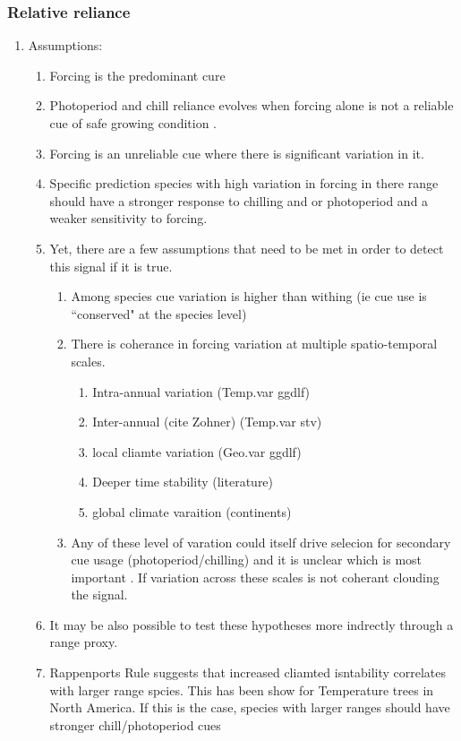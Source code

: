 \documentclass[11pt]{article}\usepackage[]{graphicx}\usepackage[]{color}
\begin{document}
\subsubsection{Relative reliance}
\begin{enumerate}
\item Assumptions:
\begin{enumerate}
\item Forcing is the predominant cure
\item Photoperiod and chill reliance evolves when forcing alone is not a reliable cue of safe growing condition \citep{Korner:2010aa}.
\item Forcing is an unreliable cue where there is significant variation in it.
\item Specific prediction species with high variation in forcing in there range should have a stronger response to chilling and or photoperiod and a weaker sensitivity to forcing. 
\item Yet, there are a few assumptions that need to be met in order to detect this signal if it is true.\\
\begin{enumerate}
\item Among species cue variation is higher than withing (ie cue use is ``conserved" at the species level)
\item There is coherance in forcing variation at multiple spatio-temporal scales.
\begin{enumerate}
\item Intra-annual variation (Temp.var ggdlf)
\item Inter-annual (cite Zohner) (Temp.var stv)
\item local cliamte variation (Geo.var ggdlf)
\item Deeper time stability \citep{} (literature)
\item global climate varaition (continents)

\end{enumerate}
\item Any of these level of varation could itself drive selecion for secondary cue usage (photoperiod/chilling) and it is unclear which is most important \citep{Zagmajster:2014aa}. If variation across these scales is not coherant clouding the signal.
\end{enumerate}
\item It may be also possible to test these hypotheses more indrectly through a range proxy.
\item Rappenports Rule suggests that increased cliamted isntability correlates with larger range spcies. This has been show for Temperature trees in North America\citep{Morin:2011aa}. If this is the case, species with larger ranges should have stronger chill/photoperiod cues
\end{enumerate}
\end{enumerate}
\end{document}
